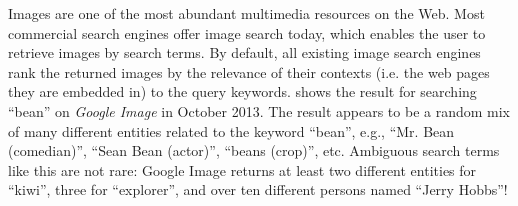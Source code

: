 %
%
%

%
Images are one of the most abundant multimedia resources on the Web.
Most commercial search engines offer image search today,
which enables the user to retrieve images by search terms.
By default, all existing image search engines rank the returned images
by the relevance of their contexts (i.e. the web pages they are
embedded in) to the query keywords. 
shows the result for searching ``bean'' on
\textit{Google Image} in October 2013.%
The result appears to be a random mix of many different entities
related to the keyword ``bean'', e.g.,
``Mr. Bean (comedian)'', ``Sean Bean (actor)'',
``beans (crop)'', etc. Ambiguous search terms like this
are not rare: Google Image returns at least two different entities for
``kiwi'', three for ``explorer'', %
and over ten different persons named ``Jerry Hobbs''!

